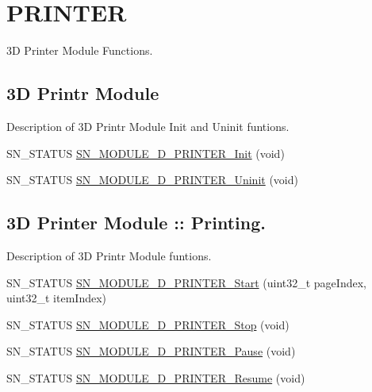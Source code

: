 \hypertarget{group__D}{}\section{P\+R\+I\+N\+T\+ER}
\label{group__D}


3D Printer Module Functions.  


\subsection*{3D Printr Module}
\label{_amgrp31919ac2a63e9801f2c4fb221e60d48f}%
Description of 3D Printr Module Init and Uninit funtions. \begin{DoxyCompactItemize}
\item 
S\+N\+\_\+\+S\+T\+A\+T\+US \hyperlink{group__D_ga801e265ffe6f8c56081112f4fdd35f39}{S\+N\+\_\+\+M\+O\+D\+U\+L\+E\+\_\+D\+\_\+\+P\+R\+I\+N\+T\+E\+R\+\_\+\+Init} (void)
\item 
S\+N\+\_\+\+S\+T\+A\+T\+US \hyperlink{group__D_ga776f5e31b0c0e176e35669f9432baec0}{S\+N\+\_\+\+M\+O\+D\+U\+L\+E\+\_\+D\+\_\+\+P\+R\+I\+N\+T\+E\+R\+\_\+\+Uninit} (void)
\end{DoxyCompactItemize}
\subsection*{3D Printer Module \+:\+: Printing.}
\label{_amgrpc4945650ed87e7ed89ffb690e375bfb1}%
Description of 3D Printr Module funtions. \begin{DoxyCompactItemize}
\item 
S\+N\+\_\+\+S\+T\+A\+T\+US \hyperlink{group__D_ga439ebb10f8ee839218655c5177e9110b}{S\+N\+\_\+\+M\+O\+D\+U\+L\+E\+\_\+D\+\_\+\+P\+R\+I\+N\+T\+E\+R\+\_\+\+Start} (uint32\+\_\+t page\+Index, uint32\+\_\+t item\+Index)
\item 
S\+N\+\_\+\+S\+T\+A\+T\+US \hyperlink{group__D_ga21ca69a451fafe2c9218c9a1737e1f15}{S\+N\+\_\+\+M\+O\+D\+U\+L\+E\+\_\+D\+\_\+\+P\+R\+I\+N\+T\+E\+R\+\_\+\+Stop} (void)
\item 
S\+N\+\_\+\+S\+T\+A\+T\+US \hyperlink{group__D_ga84a03238ddc0021011c12839757bf8c2}{S\+N\+\_\+\+M\+O\+D\+U\+L\+E\+\_\+D\+\_\+\+P\+R\+I\+N\+T\+E\+R\+\_\+\+Pause} (void)
\item 
S\+N\+\_\+\+S\+T\+A\+T\+US \hyperlink{group__D_gaabec8b5f01119d989d725eff26053ca5}{S\+N\+\_\+\+M\+O\+D\+U\+L\+E\+\_\+D\+\_\+\+P\+R\+I\+N\+T\+E\+R\+\_\+\+Resume} (void)
\end{DoxyCompactItemize}
